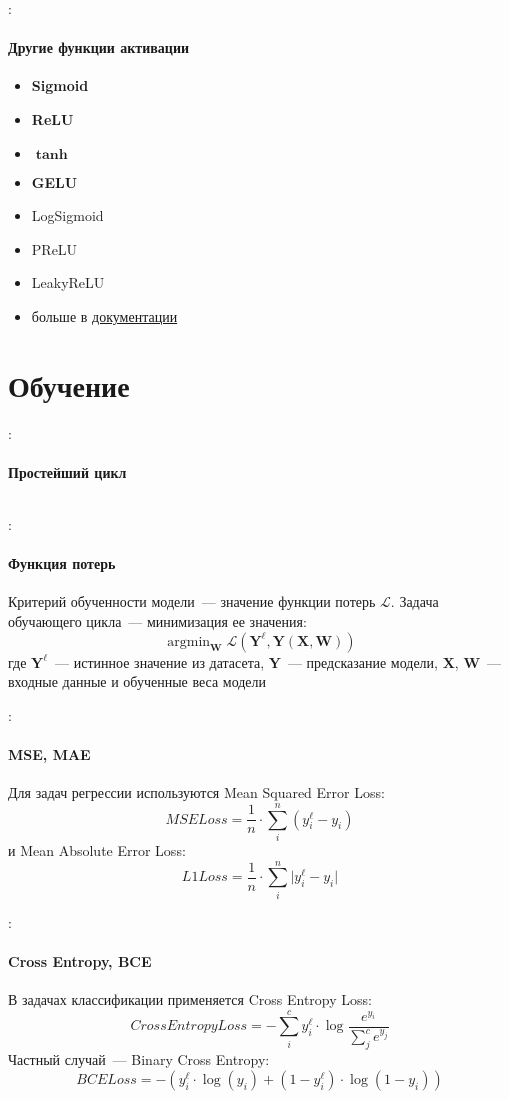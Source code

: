 \documentclass{beamer}
\DeclareMathOperator*{\argmin}{argmin}
\newcommand{\mtx}[1]{\boldsymbol{#1}}
\newcommand{\Loss}{\mathcal{L}}
\begin{document}
\begin{frame}{\secname : \subsecname}
  \framesubtitle{Другие функции активации}
  \begin{itemize}
    \item \textbf{Sigmoid}
    \item \textbf{ReLU}
    \item $\boldsymbol{\tanh}$
    \item \textbf{GELU}
    \item LogSigmoid
    \item PReLU
    \item LeakyReLU
    \item больше в
      \href{https://docs.pytorch.org/docs/stable/nn.html\#non-linear-activations-weighted-sum-nonlinearity}{документации}
  \end{itemize}
\end{frame}

\section{Обучение}

\begin{frame}{\secname : \subsecname}
  \framesubtitle{Простейший цикл}
  \inputminted[firstline=42,lastline=50]{python}{linear_regression_1/linear_regression_1.py}
\end{frame}

\begin{frame}{\secname : \subsecname}
  \framesubtitle{Функция потерь}
  Критерий обученности модели~--- значение функции потерь $\Loss$.
  Задача обучающего цикла~--- минимизация ее значения:
  $$
  \argmin_{\mtx{W}}\Loss\left(\mtx{Y}^{\ell},\mtx{Y}\left(\mtx{X},\mtx{W}\right)\right)
  $$
  где $\mtx{Y}^{\ell}$~--- истинное значение из датасета,
  $\mtx{Y}$~--- предсказание модели, $\mtx{X}$, $\mtx{W}$~--- входные
  данные и обученные веса модели
\end{frame}

\begin{frame}{\secname : \subsecname}
  \framesubtitle{MSE, MAE}
  Для задач регрессии используются Mean Squared Error Loss:
  $$
  MSELoss = \frac{1}{n}\cdot\sum_{i}^{n}\left(y^{\ell}_i - y_i\right)
  $$
  и Mean Absolute Error Loss:
  $$
  L1Loss = \frac{1}{n} \cdot \sum_{i}^{n}\lvert y^{\ell}_i - y_i\rvert
  $$
\end{frame}

\begin{frame}{\secname : \subsecname}
  \framesubtitle{Cross Entropy, BCE}
  В задачах классификации применяется Cross Entropy Loss:
  $$
  CrossEntropyLoss = -\sum_{i}^{c} y^{\ell}_i \cdot \log\frac{e^{y_{i}}}{
  \sum_{j}^{c} e^{y_{j}}}
  $$
  Частный случай~--- Binary Cross Entropy:
  $$
  BCELoss = -\left( y^{\ell}_i \cdot \log \left( y_i \right) + \left(
  1-y^{\ell}_i \right) \cdot \log \left(1 - y_i \right) \right)
  $$
\end{frame}
\end{document}
